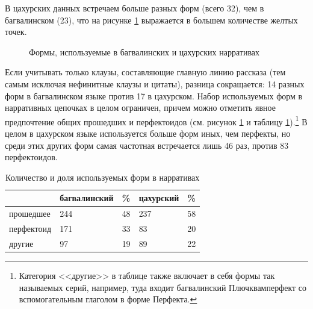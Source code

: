 В цахурских данных встречаем больше разных форм (всего 32), чем в багвалинском (23), что на рисунке \ref{fig:forms} выражается в большем количестве желтых точек.
\begin{figure}[h]
\centering
\caption{Формы, используемые в багвалинских и цахурских нарративах}
\label{fig:forms}
\vspace{0.5cm}
\end{figure}

Если учитывать только клаузы, составляющие главную линию рассказа (тем самым исключая нефинитные клаузы и цитаты), разница сокращается: 14 разных форм в багвалинском языке против 17 в цахурском. Набор используемых форм в нарративных цепочках в целом ограничен, причем можно отметить явное предпочтение общих прошедших и перфектоидов (см. рисунок \ref{fig:forms} и таблицу \ref{tab:narres}).\footnote{Категория <<другие>> в таблице также включает в себя формы так называемых серий, например, туда входит багвалинский Плючквамперфект со вспомогательным глаголом в форме Перфекта.} В целом в цахурском языке используется больше форм иных, чем перфекты, но среди этих других форм самая частотная встречается лишь 46 раз, против 83 перфектоидов.

\begin{table}[H]
\caption{Количество и доля используемых форм в нарративах}
\label{tab:narres}
\vspace{0.2cm}
\begin{center}
\begin{tabular}{lllll}
                                & багвалинский & \% & цахурский & \% \\ \hline
\multicolumn{1}{l|}{прошедшее}  & 244          & 48 & 237       & 58 \\
\multicolumn{1}{l|}{перфектоид} & 171          & 33 & 83        & 20 \\
\multicolumn{1}{l|}{другие}     & 97           & 19 & 89        & 22
\end{tabular}
\end{center}
\end{table}

